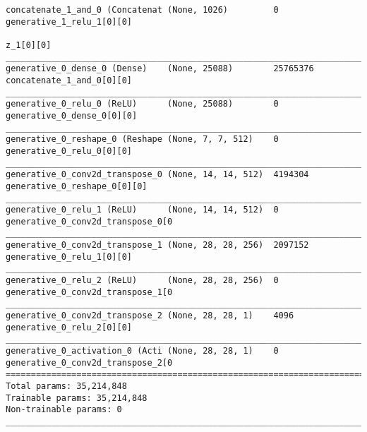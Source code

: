 \begin{lstlisting}[caption={\textsc{Mnist}-VLAE-GAN Decoder},captionpos=b,basicstyle=\tiny, label={lst:mnist-vlae-gan-decoder}]
concatenate_1_and_0 (Concatenat (None, 1026)         0           generative_1_relu_1[0][0]
                                                                 z_1[0][0]
__________________________________________________________________________________________________
generative_0_dense_0 (Dense)    (None, 25088)        25765376    concatenate_1_and_0[0][0]
__________________________________________________________________________________________________
generative_0_relu_0 (ReLU)      (None, 25088)        0           generative_0_dense_0[0][0]
__________________________________________________________________________________________________
generative_0_reshape_0 (Reshape (None, 7, 7, 512)    0           generative_0_relu_0[0][0]
__________________________________________________________________________________________________
generative_0_conv2d_transpose_0 (None, 14, 14, 512)  4194304     generative_0_reshape_0[0][0]
__________________________________________________________________________________________________
generative_0_relu_1 (ReLU)      (None, 14, 14, 512)  0           generative_0_conv2d_transpose_0[0
__________________________________________________________________________________________________
generative_0_conv2d_transpose_1 (None, 28, 28, 256)  2097152     generative_0_relu_1[0][0]
__________________________________________________________________________________________________
generative_0_relu_2 (ReLU)      (None, 28, 28, 256)  0           generative_0_conv2d_transpose_1[0
__________________________________________________________________________________________________
generative_0_conv2d_transpose_2 (None, 28, 28, 1)    4096        generative_0_relu_2[0][0]
__________________________________________________________________________________________________
generative_0_activation_0 (Acti (None, 28, 28, 1)    0           generative_0_conv2d_transpose_2[0
==================================================================================================
Total params: 35,214,848
Trainable params: 35,214,848
Non-trainable params: 0
__________________________________________________________________________________________________
\end{lstlisting}